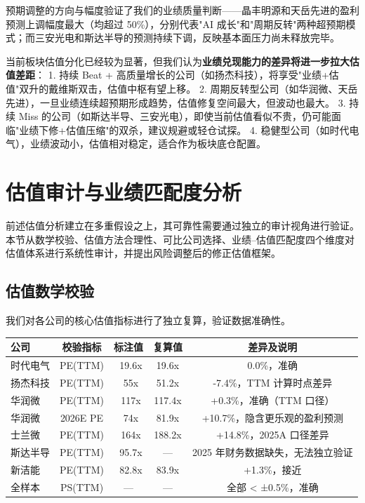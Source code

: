 预期调整的方向与幅度验证了我们的业绩质量判断——晶丰明源和天岳先进的盈利预测上调幅度最大（均超过 50\%），分别代表"AI 成长"和"周期反转"两种超预期模式；而三安光电和斯达半导的预测持续下调，反映基本面压力尚未释放完毕。

\begin{keyinsight}[业绩兑现将成为估值分化的核心驱动力]
当前板块估值分化已经较为显著，但我们认为\textbf{业绩兑现能力的差异将进一步拉大估值差距}：
1. 持续 Beat + 高质量增长的公司（如扬杰科技），将享受"业绩+估值"双升的戴维斯双击，估值中枢有望上移。
2. 周期反转型公司（如华润微、天岳先进），一旦业绩连续超预期形成趋势，估值修复空间最大，但波动也最大。
3. 持续 Miss 的公司（如斯达半导、三安光电），即使当前估值看似不贵，仍可能面临"业绩下修+估值压缩"的双杀，建议规避或轻仓试探。
4. 稳健型公司（如时代电气），业绩波动小，估值相对稳定，适合作为板块底仓配置。
\end{keyinsight}

\section{估值审计与业绩匹配度分析}

前述估值分析建立在多重假设之上，其可靠性需要通过独立的审计视角进行验证。本节从数学校验、估值方法合理性、可比公司选择、业绩--估值匹配度四个维度对估值体系进行系统性审计，并提出风险调整后的修正估值框架。

\subsection{估值数学校验}

我们对各公司的核心估值指标进行了独立复算，验证数据准确性。

\begin{exhibitbox}[表 7-9：核心估值指标数学校验结果]
\centering
\small
\begin{tabularx}{\textwidth}{l c c c c}
\toprule
\textbf{公司} & \textbf{校验指标} & \textbf{标注值} & \textbf{复算值} & \textbf{差异及说明} \\
\midrule
\rowcolor{riskgreen!10}
时代电气 & PE(TTM) & ~19.6x & 19.6x & 0.0\%，准确 \\
\rowcolor{riskgreen!10}
扬杰科技 & PE(TTM) & ~55x & 51.2x & -7.4\%，TTM 计算时点差异 \\
\rowcolor{riskamber!10}
华润微 & PE(TTM) & ~117x & 117.4x & +0.3\%，准确（TTM 口径） \\
\rowcolor{riskamber!10}
华润微 & 2026E PE & ~74x & 81.9x & +10.7\%，隐含更乐观的盈利预测 \\
\rowcolor{riskamber!10}
士兰微 & PE(TTM) & ~164x & 188.2x & +14.8\%，2025A 口径差异 \\
\rowcolor{riskred!10}
斯达半导 & PE(TTM) & ~95.7x & — & 2025 年财务数据缺失，无法独立验证 \\
\rowcolor{riskgreen!10}
新洁能 & PE(TTM) & ~82.8x & 83.9x & +1.3\%，接近 \\
\rowcolor{riskgreen!10}
全样本 & PS(TTM) & — & — & 全部 < ±0.5\%，准确 \\
\bottomrule
\end{tabularx}
\end{exhibitbox}

